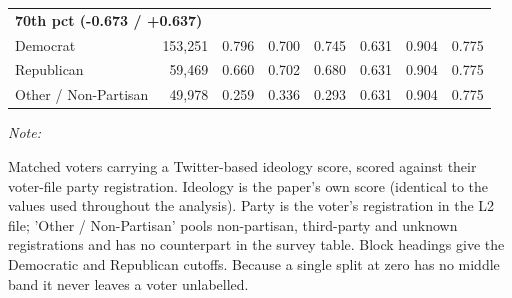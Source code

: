 \begin{table}[!h]
\begin{threeparttable}
\begin{tabular}[t]{lrrrrrrr}
\multicolumn{8}{l}{\textbf{70th pct (-0.673 / +0.637)}}\\
\hspace{1em}Democrat & 153,251 & 0.796 & 0.700 & 0.745 & 0.631 & 0.904 & 0.775\\
\hspace{1em}Republican & 59,469 & 0.660 & 0.702 & 0.680 & 0.631 & 0.904 & 0.775\\
\hspace{1em}Other / Non-Partisan & 49,978 & 0.259 & 0.336 & 0.293 & 0.631 & 0.904 & 0.775\\
\bottomrule
\end{tabular}
\begin{tablenotes}
\item \textit{Note: } 
\item Matched voters carrying a Twitter-based ideology score, scored against their voter-file party registration. Ideology is the paper's own score (identical to the values used throughout the analysis). Party is the voter's registration in the L2 file; 'Other / Non-Partisan' pools non-partisan, third-party and unknown registrations and has no counterpart in the survey table. Block headings give the Democratic and Republican cutoffs. Because a single split at zero has no middle band it never leaves a voter unlabelled.
\end{tablenotes}
\end{threeparttable}
\end{table}
